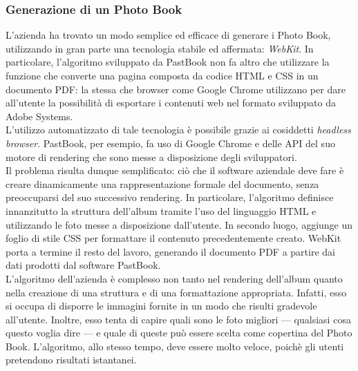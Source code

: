 			\subsubsection{Generazione di un Photo Book}
				L'azienda ha trovato un modo semplice ed efficace di generare i Photo Book, utilizzando in gran parte una tecnologia
				stabile ed affermata: \emph{WebKit}. In particolare, l'algoritmo sviluppato da
				PastBook non fa altro che utilizzare la funzione che converte una pagina composta da codice HTML e CSS in un
				documento PDF: la stessa che browser come Google Chrome utilizzano per dare
				all'utente la possibilità di esportare i contenuti web nel formato sviluppato da Adobe Systems.\\
				L'utilizzo automatizzato di tale tecnologia è possibile grazie ai cosiddetti
				\emph{headless browser}. PastBook, per esempio, fa uso di Google Chrome
				e delle API del suo motore di rendering che sono messe a disposizione degli sviluppatori.\\
				Il problema risulta dunque semplificato: ciò che il software aziendale deve fare è creare dinamicamente una
				rappresentazione formale del documento, senza preoccuparsi del suo successivo rendering. In particolare, l'algoritmo
				definisce innanzitutto la struttura dell'album tramite l'uso del linguaggio HTML e utilizzando le foto messe a
				disposizione dall'utente. In secondo luogo, aggiunge un foglio di stile CSS per formattare il contenuto
				precedentemente creato. WebKit porta a termine il resto del lavoro, generando il documento PDF a partire dai dati
				prodotti dal software PastBook.\\
				L'algoritmo dell'azienda è complesso non tanto nel rendering dell'album quanto nella creazione di una struttura e di
				una formattazione appropriata. Infatti, esso si occupa di disporre le immagini fornite in un modo che risulti
				gradevole all'utente. Inoltre, esso tenta di capire quali sono le foto migliori — qualsiasi cosa questo voglia dire —
				e quale di queste può essere scelta come copertina del Photo Book. L'algoritmo, allo stesso tempo, deve essere molto
				veloce, poichè gli utenti pretendono risultati istantanei.
